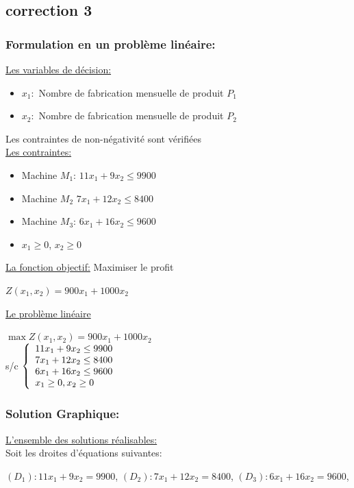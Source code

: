 \documentclass[]{book}
\begin{document}
\subsection*{correction 3}
\subsubsection{Formulation en un problème linéaire:}
\underline{Les variables de décision:}
\begin{itemize}
    \item $x_1:$ Nombre de fabrication mensuelle de produit $P_1$ 
    \item $x_2:$ Nombre de fabrication mensuelle de produit $P_2$ 
\end{itemize}
Les contraintes de non-négativité sont vérifiées\\
\underline{Les contraintes:}
\begin{itemize}
    \item Machine $M_1$: $11 x_1 + 9 x_2 \leq 9900$
    \item Machine $M_2$ $ 7x_1 + 12 x_2 \leq 8400$
    \item Machine $M_3$: $6 x_1 + 16 x_2 \leq 9600$
    \item $x_1 \geq 0$, $x_2 \geq 0$
\end{itemize}
\underline{La fonction objectif:}
Maximiser le profit\\
\begin{center}
    $Z(x_1,x_2) = 900 x_1 + 1000 x_2$
\end{center}
\underline{Le problème linéaire}
\begin{center}
    $\max Z(x_1,x_2) = 900 x_1 + 1000 x_2$\\
s/c $\left\{
	\begin{array}l
	11 x_1 + 9 x_2 \leq 9900\\
    7x_1 + 12 x_2 \leq 8400\\
    6 x_1 + 16 x_2\leq 9600\\
    x_1 \geq 0, x_2 \geq 0\end{array}
	\right.$
\end{center} 

\subsubsection{Solution Graphique:}
\underline{L'ensemble des solutions réalisables:}\\
Soit les droites d'équations suivantes:
\begin{center}
    $(D_1): 11 x_1 + 9 x_2 = 9900$, $(D_2): 7x_1 + 12 x_2 = 8400$, $(D_3): 6 x_1 + 16 x_2 = 9600$, 
\end{center}
\end{document}
